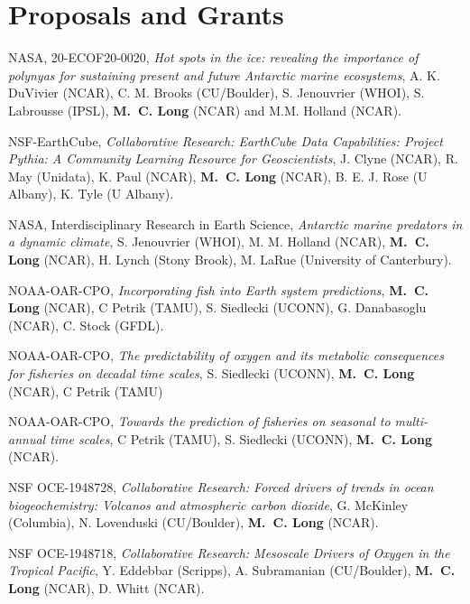 \documentclass[11pt]{article}
\begin{document}
\section{Proposals and Grants}
\begin{description}[style=multiline,leftmargin=2.5cm,font=\normalfont]

\item[2021--2024] NASA, 20-ECOF20-0020,
\textit{Hot spots in the ice: revealing the importance of polynyas for sustaining present and future Antarctic marine ecosystems},
A. K. DuVivier (NCAR), C. M. Brooks (CU/Boulder), S. Jenouvrier (WHOI), S. Labrousse (IPSL), \textbf{M.~C. Long} (NCAR) and M.M. Holland (NCAR).

\item[2021-2024] NSF-EarthCube,
\textit{Collaborative Research: EarthCube Data Capabilities: Project Pythia: A Community Learning Resource for Geoscientists},
J. Clyne (NCAR), R. May (Unidata), K. Paul (NCAR), \textbf{M.~C. Long}  (NCAR), B. E. J. Rose (U Albany), K. Tyle (U Albany).

\item[2021--2024] NASA, Interdisciplinary Research in Earth Science,
\textit{Antarctic marine predators in a dynamic climate},
S. Jenouvrier (WHOI), M. M. Holland (NCAR), \textbf{M.~C. Long} (NCAR), H. Lynch (Stony Brook), M. LaRue (University of Canterbury).

\item[2020--2023] NOAA-OAR-CPO,
\textit{Incorporating fish into Earth system predictions},
\textbf{M.~C. Long} (NCAR), C Petrik (TAMU), S. Siedlecki (UCONN), G. Danabasoglu (NCAR), C. Stock (GFDL).

\item[2020--2023] NOAA-OAR-CPO,
\textit{The predictability of oxygen and its metabolic consequences for fisheries on decadal time scales},
S. Siedlecki (UCONN), \textbf{M.~C. Long} (NCAR), C Petrik (TAMU)

\item[2020--2023] NOAA-OAR-CPO,
\textit{Towards the prediction of fisheries on seasonal to multi-annual time scales},
C Petrik (TAMU), S. Siedlecki (UCONN), \textbf{M.~C. Long} (NCAR).

\item[2020--2023] NSF OCE-1948728,
\textit{Collaborative Research: Forced drivers of trends in ocean biogeochemistry: Volcanos and atmospheric carbon dioxide},
G. McKinley (Columbia), N. Lovenduski (CU/Boulder), \textbf{M.~C. Long} (NCAR).

\item[2020--2023] NSF OCE-1948718,
\textit{Collaborative Research: Mesoscale Drivers of Oxygen in the Tropical Pacific}, Y. Eddebbar (Scripps), A. Subramanian (CU/Boulder),
\textbf{M.~C. Long} (NCAR), D. Whitt (NCAR).


\end{description}
\end{document}
